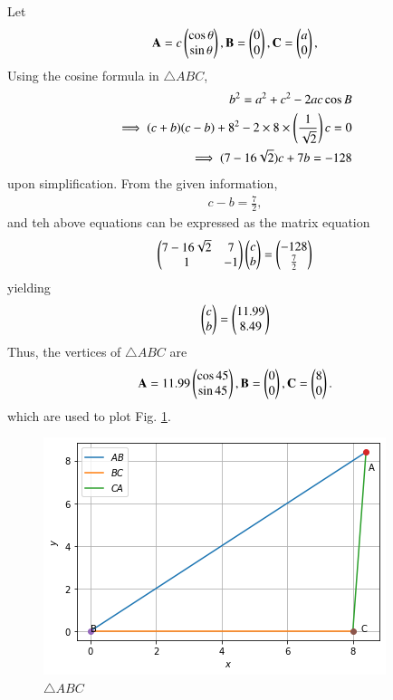 Let
\begin{align}
\mathbf{A} = c\begin{pmatrix}\cos \theta\\  \sin \theta\end{pmatrix} ,\mathbf{B} = \begin{pmatrix}0\\0\end{pmatrix},\mathbf{C} = \begin{pmatrix}a\\0\end{pmatrix},
\end{align}
Using the cosine formula in  $\triangle ABC$, 
\begin{align}
b^2 = a^2 + c^2 - 2ac \cos B 
\\
\implies (c+b)(c-b) + 8^2 - 2 \times 8\times \left(\frac{1}{\sqrt{2}}\right)c = 0 
\\
\implies (7 - 16\sqrt{2})c + 7b = -128
\end{align}
upon simplification.  From the given information,
\begin{align}
c - b =\frac{7}{2},
\end{align}
and teh above equations  can be expressed as the matrix equation
\begin{align}
\begin{pmatrix}7 - 16\sqrt{2} & 7\\1 & -1\end{pmatrix}\begin{pmatrix}c\\b\end{pmatrix} = \begin{pmatrix}-128 \\ \frac{7}{2}\end{pmatrix}
\end{align}
yielding
\begin{align}
\begin{pmatrix}c\\b\end{pmatrix}=\begin{pmatrix}11.99\\8.49\end{pmatrix}
\end{align}
Thus, the vertices of $\triangle ABC$ are
\begin{align}
\mathbf{A} = 11.99\begin{pmatrix}\cos45\\\sin45\end{pmatrix} , \mathbf{B} = \begin{pmatrix}0\\0\end{pmatrix},\mathbf{C} = \begin{pmatrix}8\\0\end{pmatrix}.
\end{align}
which are used to plot Fig.    \ref{constr/7/fig:LMN}.
\begin{figure}[!ht]
    \centering
    \includegraphics[width=\columnwidth]{solutions/7/Fig1.png}
    \caption{$\triangle ABC$}
    \label{constr/7/fig:LMN}
\end{figure}

 
 
 